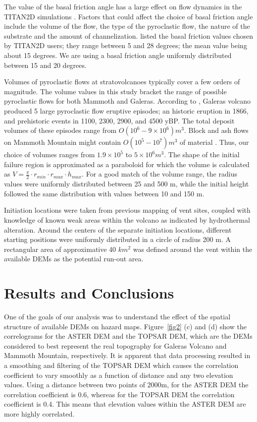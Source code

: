 \documentclass[12pt]{article}
\begin{document}
The value of the basal friction angle has a large effect on flow
dynamics in the TITAN2D simulations \citep{Patra2005,
  stinton_2006}. Factors that could affect the choice of basal
friction angle include the volume of the flow, the type of the pyroclastic
flow, the nature of the substrate and the amount of
channelization. \citet{murcia_2010} listed the basal friction values
chosen by TITAN2D users; they range between 5 and 28 degrees; the mean
value being about 15 degrees. We are using a basal friction angle
uniformly distributed between 15 and 20 degrees.
 
Volumes of pyroclastic flows at stratovolcanoes typically cover a few
orders of magnitude. The volume values in this study bracket the range
of possible pyroclastic flows for both Mammoth and Galeras.  According
to \citet{calvache_1990a}, Galeras volcano produced 5 large
pyroclastic flow eruptive episodes; an historic eruption in 1866, and
prehistoric events in 1100, 2300, 2900, and 4500 yBP.  The total
deposit volumes of these episodes range from $O(10^6 - 9\times 10^6)
m^3$.  Block and ash flows on Mammoth Mountain might contain $O(10^5 -
10^7) m^3$ of material \citep{Patra2005, Burkett2007}.  Thus, our
choice of volumes ranges from $1.9 \times 10^5$ to $5 \times 10^6
m^3$.  The shape of the initial failure region is approximated as a
paraboloid for which the volume is calculated as
$ V=\frac{\pi}{2}\cdot r_{min}\cdot r_{max} \cdot h_{max}. $
For a good match of the volume range, the radius values were uniformly
distributed between 25 and 500 m, while the initial height followed
the same distribution with values between 10 and 150 m.

Initiation locations were taken from previous mapping of vent sites,
coupled with knowledge of known weak areas within the volcano as
indicated by hydrothermal alteration.  Around the centers of the
separate initiation locations, different starting positions were
uniformly distributed in a circle of radius 200 m.  A rectangular area
of approximative 40 $km^2$ was defined around the vent within the
available DEMs as the potential run-out area.

\section{Results and Conclusions}

One of the goals of our analysis was to understand the effect of the
spatial structure of available DEMs on hazard maps. Figure~\ref{fig2}
(c) and (d) show the correlograms for the ASTER DEM and the TOPSAR
DEM, which are the DEMs considered to best represent the real
topography for Galeras Volcano and Mammoth Mountain, respectively. It
is apparent that data processing resulted in a smoothing and filtering
of the TOPSAR DEM which causes the correlation coefficient to vary
smoothly as a function of distance and any two elevation values.
Using a distance between two points of 2000m, for the ASTER DEM the
correlation coefficient is 0.6, whereas for the TOPSAR DEM the
correlation coefficient is 0.4. This means that elevation values
within the ASTER DEM are more highly correlated.
\end{document}
